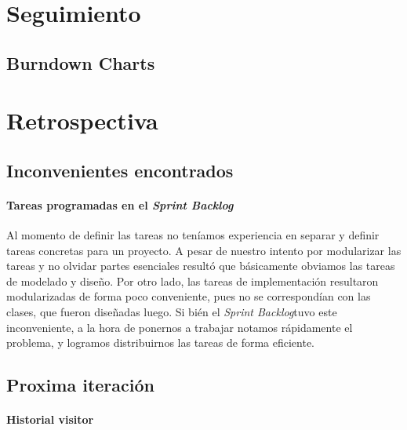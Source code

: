\documentclass{article}
\newcommand{\prodback}{\textit{Product Backlog}}
\newcommand{\sprintback}{\textit{Sprint Backlog}}
\begin{document}

  \maketitle
  \newpage
  \tableofcontents
  \newpage

  

  

  \section{Seguimiento}
    \subsection{Burndown Charts}

  

  \section{Retrospectiva}
    \subsection{Inconvenientes encontrados}
    \paragraph{Tareas programadas en el \sprintback}
    Al momento de definir las tareas no ten\'iamos experiencia en separar y definir
    tareas concretas para un proyecto. A pesar de nuestro intento por modularizar
    las tareas y no olvidar partes esenciales result\'o que b\'asicamente obviamos
    las tareas de modelado y dise\~no. Por otro lado, las tareas de implementaci\'on
    resultaron modularizadas de forma poco conveniente, pues no se correspond\'ian
    con las clases, que fueron dise\~nadas luego. Si bi\'en el \sprintback tuvo
    este inconveniente, a la hora de ponernos a trabajar notamos r\'apidamente
    el problema, y logramos distribuirnos las tareas de forma eficiente.

    \subsection{Proxima iteraci\'on}

    \paragraph{Historial visitor}
\end{document}
